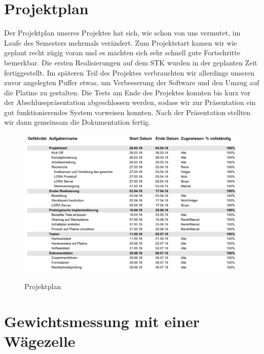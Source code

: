 \chapter{Projektplan}
Der Projektplan unseres Projektes hat sich, wie schon von uns vermutet, im Laufe des Semesters mehrmals verändert. Zum Projektstart kamen wir wie geplant recht zügig voran und es machten sich sehr schnell gute Fortschritte bemerkbar. Die ersten Realisierungen auf dem STK wurden in der geplanten Zeit fertiggestellt. Im späteren Teil des Projektes verbrauchten wir allerdings unseren zuvor angelegten Puffer etwas, um Verbesserung der Software und den Umzug auf die Platine zu gestalten. Die Tests am Ende des Projektes konnten bis kurz vor der Abschlusspräsentation abgeschlossen werden, sodass wir zur Präsentation ein gut funktionierendes System vorweisen konnten. Nach der Präsentation stellten wir dann gemeinsam die Dokumentation fertig. 
\begin{figure}[ht]
    \center
    \includegraphics[width=15cm]{Bilder/projektplan.png}\\
    \caption{Projektplan}
    \label{fig:Projektplan}
\end{figure}

\chapter{Gewichtsmessung mit einer Wägezelle}
